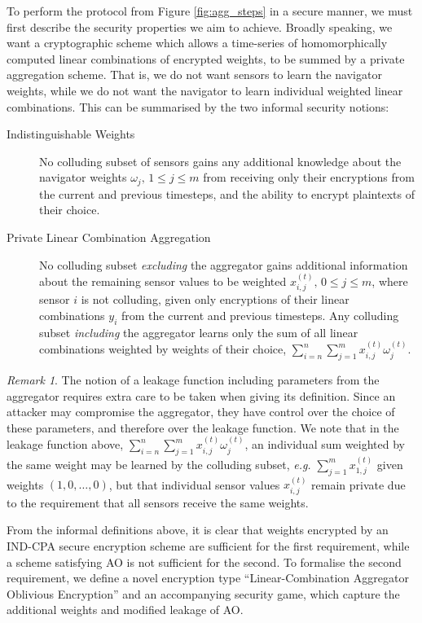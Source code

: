 \documentclass[twocolumn]{autart}
\theoremstyle{definition}
\theoremstyle{remark}
\newtheorem{remark}{Remark}
\begin{document}
To perform the protocol from Figure \ref{fig:agg_steps} in a secure manner, we must first describe the security properties we aim to achieve. Broadly speaking, we want a cryptographic scheme which allows a time-series of homomorphically computed linear combinations of encrypted weights, to be summed by a private aggregation scheme. That is, we do not want sensors to learn the navigator weights, while we do not want the navigator to learn individual weighted linear combinations. This can be summarised by the two informal security notions:
\begin{description}
    \item[Indistinguishable Weights] No colluding subset of sensors gains any additional knowledge about the navigator weights $\omega_j,\,1\leq j \leq m$ from receiving only their encryptions from the current and previous timesteps, and the ability to encrypt plaintexts of their choice.
    \item[Private Linear Combination Aggregation] No colluding subset \textit{excluding} the aggregator gains additional information about the remaining sensor values to be weighted $x^{(t)}_{i,j},\,0\leq j\leq m$, where sensor $i$ is not colluding, given only encryptions of their linear combinations $y_i$ from the current and previous timesteps. Any colluding subset \textit{including} the aggregator learns only the sum of all linear combinations weighted by weights of their choice, $\sum^n_{i=n}\sum^m_{j=1}x^{(t)}_{i,j}\omega^{(t)}_j$.
\end{description}

\begin{remark}
    The notion of a leakage function including parameters from the aggregator requires extra care to be taken when giving its definition. Since an attacker may compromise the aggregator, they have control over the choice of these parameters, and therefore over the leakage function. We note that in the leakage function above, $\sum^n_{i=n}\sum^m_{j=1}x^{(t)}_{i,j}\omega^{(t)}_j$, an individual sum weighted by the same weight may be learned by the colluding subset, \textit{e.g.} $\sum^m_{j=1}x^{(t)}_{1,j}$ given weights $(1,0,\dots,0)$, but that individual sensor values $x^{(t)}_{i,j}$ remain private due to the requirement that all sensors receive the same weights.
\end{remark}

From the informal definitions above, it is clear that weights encrypted by an IND-CPA secure encryption scheme are sufficient for the first requirement, while a scheme satisfying AO is not sufficient for the second. To formalise the second requirement, we define a novel encryption type ``Linear-Combination Aggregator Oblivious Encryption'' and an accompanying security game, which capture the additional weights and modified leakage of AO.
\end{document}
